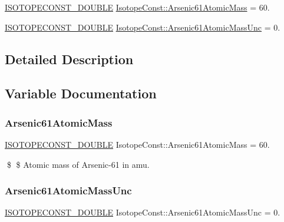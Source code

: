 \begin{DoxyCompactItemize}
\item 
\mbox{\hyperlink{group___isotope_const-_macros_ga8f45a7272ce02c0b4c65c44636ed719a}{I\+S\+O\+T\+O\+P\+E\+C\+O\+N\+S\+T\+\_\+\+D\+O\+U\+B\+LE}} \mbox{\hyperlink{group___isotope_const-_arsenic-_as61_ga33f3d24fcb50f497f62849105cdb7c92}{Isotope\+Const\+::\+Arsenic61\+Atomic\+Mass}} = 60.
\item 
\mbox{\hyperlink{group___isotope_const-_macros_ga8f45a7272ce02c0b4c65c44636ed719a}{I\+S\+O\+T\+O\+P\+E\+C\+O\+N\+S\+T\+\_\+\+D\+O\+U\+B\+LE}} \mbox{\hyperlink{group___isotope_const-_arsenic-_as61_ga3ace5d3f016d1c2ccc72be9ca258d928}{Isotope\+Const\+::\+Arsenic61\+Atomic\+Mass\+Unc}} = 0.
\end{DoxyCompactItemize}


\subsection{Detailed Description}


\subsection{Variable Documentation}
\mbox{\label{group___isotope_const-_arsenic-_as61_ga33f3d24fcb50f497f62849105cdb7c92}} 
\subsubsection{\texorpdfstring{Arsenic61\+Atomic\+Mass}{Arsenic61AtomicMass}}
{\footnotesize\ttfamily \mbox{\hyperlink{group___isotope_const-_macros_ga8f45a7272ce02c0b4c65c44636ed719a}{I\+S\+O\+T\+O\+P\+E\+C\+O\+N\+S\+T\+\_\+\+D\+O\+U\+B\+LE}} Isotope\+Const\+::\+Arsenic61\+Atomic\+Mass = 60.}

\$ \$ Atomic mass of Arsenic-\/61 in amu. \mbox{\label{group___isotope_const-_arsenic-_as61_ga3ace5d3f016d1c2ccc72be9ca258d928}} 
\subsubsection{\texorpdfstring{Arsenic61\+Atomic\+Mass\+Unc}{Arsenic61AtomicMassUnc}}
{\footnotesize\ttfamily \mbox{\hyperlink{group___isotope_const-_macros_ga8f45a7272ce02c0b4c65c44636ed719a}{I\+S\+O\+T\+O\+P\+E\+C\+O\+N\+S\+T\+\_\+\+D\+O\+U\+B\+LE}} Isotope\+Const\+::\+Arsenic61\+Atomic\+Mass\+Unc = 0.}

